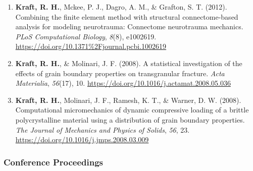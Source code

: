 \documentclass[11pt]{article}
\begin{document}
\begin{enumerate}
\item
  \textbf{\textbf{Kraft,} R. 
H.}, Mckee, P. 
J., Dagro, A. 
M., \& Grafton, S. 
T. 
(2012).
  Combining the finite element method with structural connectome-based
  analysis for modeling neurotrauma: Connectome neurotrauma mechanics.
  \emph{PLoS Computational Biology}, \emph{8}(8), e1002619.
  \url{https://doi.org/10.1371\%2Fjournal.pcbi.1002619}
\item
  \textbf{\textbf{Kraft,} R. 
H.}, \& Molinari, J. 
F. 
(2008). 
A statistical investigation
  of the effects of grain boundary properties on transgranular fracture.
  \emph{Acta Materialia}, \emph{56}(17), 10.
  \url{https://doi.org/10.1016/j.actamat.2008.05.036}
\item
  \textbf{\textbf{Kraft,} R. 
H.}, Molinari, J. 
F., Ramesh, K. 
T., \& Warner, D. 
W. 
(2008).
  Computational micromechanics of dynamic compressive loading of a
  brittle polycrystalline material using a distribution of grain
  boundary properties. 
\emph{The Journal of Mechanics and Physics of
  Solids}, \emph{56}, 23.
  \url{https://doi.org/10.1016/j.jmps.2008.03.009}
\end{enumerate}

\subsubsection{Conference Proceedings}\label{conference-proceeding}
\end{document}
